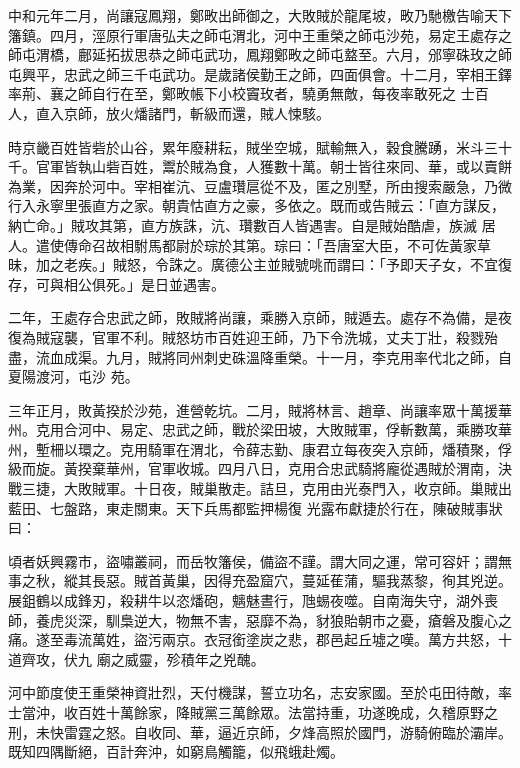 \begin{pinyinscope}
 中和元年二月，尚讓寇鳳翔，鄭畋出師御之，大敗賊於龍尾坡，畋乃馳檄告喻天下籓鎮。四月，涇原行軍唐弘夫之師屯渭北，河中王重榮之師屯沙苑，易定王處存之師屯渭橋，鄜延拓拔思恭之師屯武功，鳳翔鄭畋之師屯盩至。六月，邠寧硃玫之師屯興平，忠武之師三千屯武功。是歲諸侯勤王之師，四面俱會。十二月，宰相王鐸率荊、襄之師自行在至，鄭畋帳下小校竇玫者，驍勇無敵，每夜率敢死之
 士百人，直入京師，放火燔諸門，斬級而還，賊人悚駭。



 時京畿百姓皆砦於山谷，累年廢耕耘，賊坐空城，賦輸無入，穀食騰踴，米斗三十千。官軍皆執山砦百姓，鬻於賊為食，人獲數十萬。朝士皆往來同、華，或以賣餅為業，因奔於河中。宰相崔沆、豆盧瓚扈從不及，匿之別墅，所由搜索嚴急，乃微行入永寧里張直方之家。朝貴怙直方之豪，多依之。既而或告賊云：「直方謀反，納亡命。」賊攻其第，直方族誅，沆、瓚數百人皆遇害。自是賊始酷虐，族滅
 居人。遣使傳命召故相駙馬都尉於琮於其第。琮曰：「吾唐室大臣，不可佐黃家草昧，加之老疾。」賊怒，令誅之。廣德公主並賊號咷而謂曰：「予即天子女，不宜復存，可與相公俱死。」是日並遇害。



 二年，王處存合忠武之師，敗賊將尚讓，乘勝入京師，賊遁去。處存不為備，是夜復為賊寇襲，官軍不利。賊怒坊市百姓迎王師，乃下令洗城，丈夫丁壯，殺戮殆盡，流血成渠。九月，賊將同州刺史硃溫降重榮。十一月，李克用率代北之師，自夏陽渡河，屯沙
 苑。



 三年正月，敗黃揆於沙苑，進營乾坑。二月，賊將林言、趙章、尚讓率眾十萬援華州。克用合河中、易定、忠武之師，戰於梁田坡，大敗賊軍，俘斬數萬，乘勝攻華州，塹柵以環之。克用騎軍在渭北，令薛志勤、康君立每夜突入京師，燔積聚，俘級而旋。黃揆棄華州，官軍收城。四月八日，克用合忠武騎將龐從遇賊於渭南，決戰三捷，大敗賊軍。十日夜，賊巢散走。詰旦，克用由光泰門入，收京師。巢賊出藍田、七盤路，東走關東。天下兵馬都監押楊復
 光露布獻捷於行在，陳破賊事狀曰：



 頃者妖興霧市，盜嘯叢祠，而岳牧籓侯，備盜不謹。謂大同之運，常可容奸；謂無事之秋，縱其長惡。賊首黃巢，因得充盈窟穴，蔓延萑蒲，驅我蒸黎，徇其兇逆。展鉏鶴以成鋒刃，殺耕牛以恣燔砲，魑魅晝行，虺蜴夜噬。自南海失守，湖外喪師，養虎災深，馴梟逆大，物無不害，惡靡不為，豺狼貽朝市之憂，瘡磐及腹心之痛。遂至毒流萬姓，盜污兩京。衣冠銜塗炭之悲，郡邑起丘墟之嘆。萬方共怒，十道齊攻，伏九
 廟之威靈，殄積年之兇醜。



 河中節度使王重榮神資壯烈，天付機謀，誓立功名，志安家國。至於屯田待敵，率士當沖，收百姓十萬餘家，降賊黨三萬餘眾。法當持重，功遂晚成，久稽原野之刑，未快雷霆之怒。自收同、華，逼近京師，夕烽高照於國門，游騎俯臨於灞岸。既知四隅斷絕，百計奔沖，如窮鳥觸籠，似飛蛾赴燭。




\end{pinyinscope}
